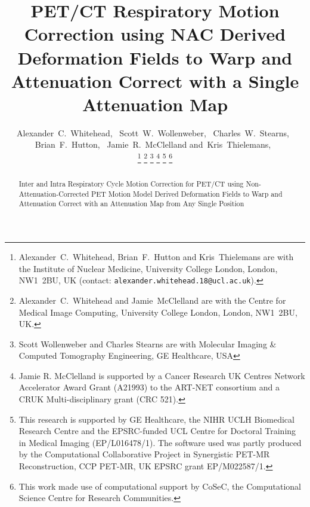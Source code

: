 \documentclass[10pt, twocolumn, twoside, letterpaper]{IEEEtran}
\begin{document}
\title{PET/CT Respiratory Motion Correction using NAC Derived Deformation Fields to Warp and Attenuation Correct with a Single Attenuation Map}

\pagestyle{plain}

\author{Alexander~C.~Whitehead,~
        Scott~W.~Wollenweber,~
        Charles~W.~Stearns,~
        Brian~F.~Hutton,~
        Jamie~R.~McClelland
        and~Kris~Thielemans,~%

    \thanks{Alexander~C.~Whitehead, Brian~F.~Hutton and Kris~Thielemans are with the Institute of Nuclear Medicine, University College London, London, NW1~2BU, UK (contact: \texttt{alexander.whitehead.18@ucl.ac.uk}).}%
    \thanks{Alexander~C.~Whitehead and Jamie~McClelland are with the Centre for Medical Image Computing, University College London, London, NW1~2BU, UK.}%
    \thanks{Scott Wollenweber and Charles Stearns are with Molecular Imaging \& Computed Tomography Engineering, GE Healthcare, USA}%
    \thanks{Jamie R. McClelland is supported by a Cancer Research UK Centres Network Accelerator Award Grant (A21993) to the ART-NET consortium and a CRUK Multi-disciplinary grant (CRC 521).}%
    \thanks{This research is supported by GE Healthcare, the NIHR UCLH Biomedical Research Centre and the EPSRC-funded UCL Centre for Doctoral Training in Medical Imaging (EP/L016478/1).%
    The software used was partly produced by the Computational Collaborative Project in Synergistic PET-MR Reconstruction, CCP PET-MR, UK EPSRC grant EP/M022587/1.}%
    \thanks{This work made use of computational support by CoSeC, the Computational Science Centre for Research Communities.}%
}

\maketitle
\IEEEpeerreviewmaketitle

\begin{abstract}
    Inter and Intra Respiratory Cycle Motion Correction for PET/CT using Non-Attenuation-Corrected PET Motion Model Derived Deformation Fields to Warp and Attenuation Correct with an Attenuation Map from Any Single Position
\end{abstract}
\end{document}

